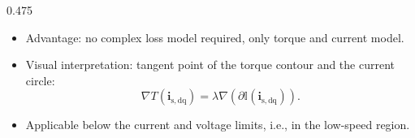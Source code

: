 \begin{frame}
\begin{columns}
\begin{column}{0.475\textwidth}
\begin{itemize}
                \item<2-> Advantage: no complex loss model required, only torque and current model.
                \item<3-> Visual interpretation: tangent point of the torque contour and the current circle:
                      $$
                          \nabla T(\bm{i}_{\mathrm{s,dq}}) = \lambda \nabla (\partial\mathbb{I}(\bm{i}_{\mathrm{s,dq}})).
                      $$
                \item<4-> Applicable below the current and voltage limits, i.e., in the low-speed region.
            \end{itemize}
        \end{column}
    \end{columns}
\end{frame}

